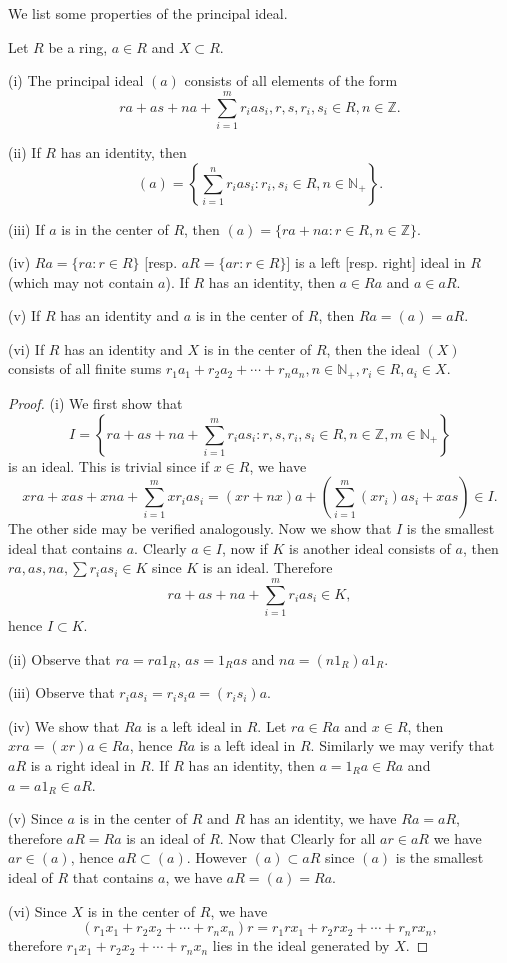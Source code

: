 We list some properties of the principal ideal.
\begin{theorem}
Let $R$ be a ring, $a\in R$ and $X\subset R$.\par
(i) The principal ideal $(a)$ consists of all elements of the form $$ra+as+na+\sum_{i=1}^mr_ias_i,r,s,r_i,s_i\in R,n\in\mathbb{Z}.$$\par
(ii) If $R$ has an identity, then 
$$(a)=\left\{\sum_{i=1}^nr_ias_i:r_i,s_i\in R,n\in\mathbb{N}_+\right\}.$$\par
(iii) If $a$ is in the center of $R$, then $(a)=\{ra+na:r\in R,n\in\mathbb{Z}\}$.\par
(iv) $Ra=\{ra:r\in R\}$ [resp. $aR=\{ar:r\in R\}$] is a left [resp. right] ideal in $R$ (which may not contain $a$). If $R$ has an identity, then $a\in Ra$ and $a\in aR$.\par
(v) If $R$ has an identity and $a$ is in the center of $R$, then $Ra=(a)=aR$.\par
(vi) If $R$ has an identity and $X$ is in the center of $R$, then the ideal $(X)$ consists of all finite sums $r_1a_1+r_2a_2+\cdots+r_na_n,n\in\mathbb{N}_+,r_i\in R,a_i\in X$.
\end{theorem}
\begin{proof}
(i) We first show that 
$$
I=\left\{ ra+as+na+\sum_{i=1}^m{r_ias_i}:r,s,r_i,s_i\in R,n\in \mathbb{Z} ,m\in \mathbb{N} _+ \right\} 
$$
is an ideal. This is trivial since if $x\in R$, we have 
$$
xra+xas+xna+\sum_{i=1}^m{xr_ias_i}=\left( xr+nx \right) a+\left( \sum_{i=1}^m{\left( xr_i \right) as_i}+xas \right) \in I.
$$
The other side may be verified analogously. Now we show that $I$ is the smallest ideal that contains $a$. Clearly $a\in I$, now if $K$ is another ideal consists of $a$, then $ra,as,na,\sum r_ias_i\in K$ since $K$ is an ideal. Therefore 
$$ra+as+na+\sum_{i=1}^mr_ias_i\in K,$$
hence $I\subset K$.\par
(ii) Observe that $ra=ra1_R$, $as=1_Ras$ and $na=(n1_R)a1_R$.\par
(iii) Observe that $r_ias_i=r_is_ia=(r_is_i)a$.\par
(iv) We show that $Ra$ is a left ideal in $R$. Let $ra\in Ra$ and $x\in R$, then $xra=(xr)a\in Ra$, hence $Ra$ is a left ideal in $R$. Similarly we may verify that $aR$ is a right ideal in $R$. If $R$ has an identity, then $a=1_Ra\in Ra$ and $a=a1_R\in aR$.\par
(v) Since $a$ is in the center of $R$ and $R$ has an identity, we have $Ra=aR$, therefore $aR=Ra$ is an ideal of $R$. Now that Clearly for all $ar\in aR$ we have $ar\in(a)$, hence $aR\subset(a)$. However $(a)\subset aR$ since $(a)$ is the smallest ideal of $R$ that contains $a$, we have $aR=(a)=Ra$.\par
(vi) Since $X$ is in the center of $R$, we have 
$$
\left( r_1x_1+r_2x_2+\cdots +r_nx_n \right) r=r_1rx_1+r_2rx_2+\cdots +r_nrx_n,
$$
therefore $r_1x_1+r_2x_2+\cdots+r_nx_n$ lies in the ideal generated by $X$.
\end{proof}
